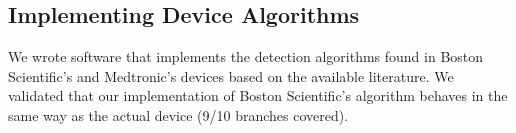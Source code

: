 \subsection{Implementing Device Algorithms} 
\label{sec:device models}
We wrote software that implements the detection algorithms found in Boston Scientific's and Medtronic's devices based on the available literature.
We validated that our implementation of Boston Scientific's algorithm behaves in the same way as the actual device (9/10 branches covered).
